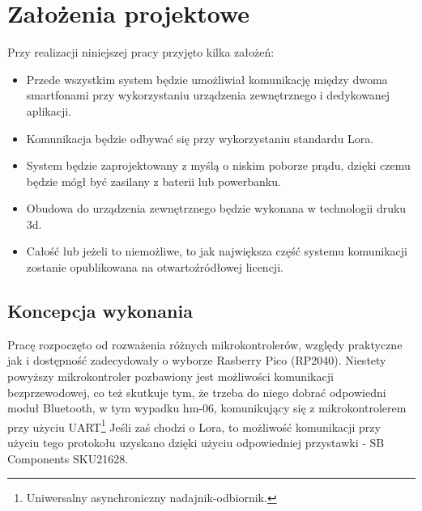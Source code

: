 \newpage %
\section{Założenia projektowe}
Przy realizacji niniejszej pracy przyjęto kilka założeń:
\begin{itemize}
	\item Przede wszystkim system będzie umożliwiał komunikację między dwoma smartfonami przy wykorzystaniu urządzenia zewnętrznego i dedykowanej aplikacji.
	\item Komunikacja będzie odbywać się przy wykorzystaniu standardu Lora.
	\item System będzie zaprojektowany z myślą o niskim poborze prądu, dzięki czemu będzie mógł być zasilany z baterii lub powerbanku.
	\item Obudowa do urządzenia zewnętrznego będzie wykonana w technologii druku 3d.
	\item Całość lub jeżeli to niemożliwe, to jak największa część systemu komunikacji zostanie opublikowana na otwartoźródłowej licencji.
\end{itemize}
\subsection{Koncepcja wykonania}
Pracę rozpoczęto od rozważenia różnych mikrokontrolerów, względy praktyczne jak i dostępność zadecydowały o wyborze Rasberry Pico (RP2040). Niestety powyższy mikrokontroler pozbawiony jest możliwości komunikacji bezprzewodowej, co też skutkuje tym, że trzeba do niego dobrać odpowiedni moduł Bluetooth, w tym wypadku hm-06, komunikujący się z mikrokontrolerem przy użyciu UART\footnote{Uniwersalny asynchroniczny nadajnik-odbiornik.}
Jeśli zaś chodzi o Lora, to możliwość komunikacji przy użyciu tego protokołu uzyskano dzięki użyciu odpowiedniej przystawki - SB Components SKU21628.